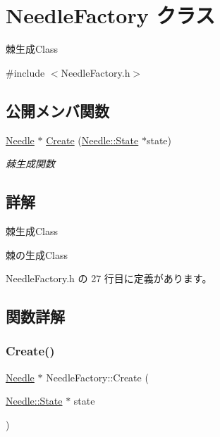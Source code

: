 \hypertarget{class_needle_factory}{}\section{Needle\+Factory クラス}
\label{class_needle_factory}


棘生成\+Class  




{\ttfamily \#include $<$Needle\+Factory.\+h$>$}

\subsection*{公開メンバ関数}
\begin{DoxyCompactItemize}
\item 
\mbox{\hyperlink{class_needle}{Needle}} $\ast$ \mbox{\hyperlink{class_needle_factory_a0284bfc15e16d67574a272a2e350e87c}{Create}} (\mbox{\hyperlink{class_needle_1_1_state}{Needle\+::\+State}} $\ast$state)
\begin{DoxyCompactList}\small\item\em 棘生成関数 \end{DoxyCompactList}\end{DoxyCompactItemize}


\subsection{詳解}
棘生成\+Class 

棘の生成\+Class 

 Needle\+Factory.\+h の 27 行目に定義があります。



\subsection{関数詳解}
\mbox{\label{class_needle_factory_a0284bfc15e16d67574a272a2e350e87c}} 
\subsubsection{\texorpdfstring{Create()}{Create()}}
{\footnotesize\ttfamily \mbox{\hyperlink{class_needle}{Needle}} $\ast$ Needle\+Factory\+::\+Create (\begin{DoxyParamCaption}\item[{\mbox{\hyperlink{class_needle_1_1_state}{Needle\+::\+State}} $\ast$}]{state }\end{DoxyParamCaption})}



